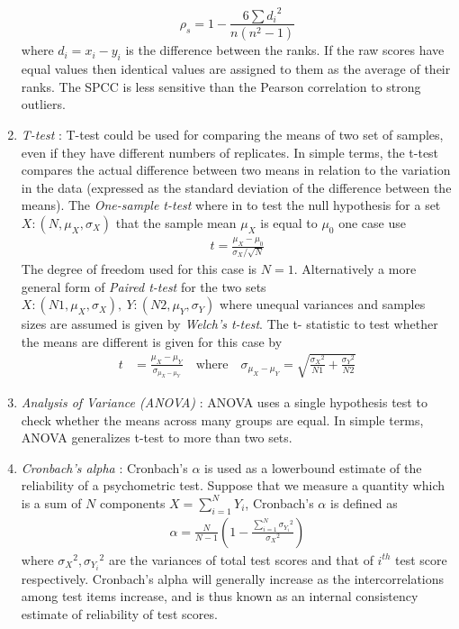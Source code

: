 \begin{enumerate}
\begin{equation}
\rho_s = 1-\frac{6\sum {d_i}^2}{n(n^2-1)} 
\end{equation}
where $d_i=x_i-y_i$ is the difference between the ranks. If the raw scores have equal values then identical values are assigned to them as the average of their ranks. The SPCC is less sensitive than the Pearson correlation to strong outliers. 
\item \emph{T-test} : T-test could be used for comparing the means of two set of samples, even if they have different numbers of replicates. In simple terms, the t-test compares the actual difference between two means in relation to the variation in the data (expressed as the standard deviation of the difference between the means). The \emph{One-sample t-test} where in to test the null hypothesis for a set $X:(N,\mu_X,\sigma_X)$ that the sample mean $\mu_X$ is equal to $\mu_0$ one case use
\begin{align*}
t = \frac{\mu_X - \mu_0}{\sigma_X/\sqrt{N}}
\end{align*}
The degree of freedom used for this case is $N=1$. Alternatively a more general form of \emph{Paired t-test} for the two sets $X:(N1,\mu_X,\sigma_X),\ Y:(N2,\mu_Y,\sigma_Y)$ where unequal variances and samples sizes are assumed is given by \emph{Welch's t-test}. The t- statistic to test whether the means are different is given for this case by
\begin{align*}
t &= \frac{\mu_X-\mu_Y}{\sigma_{\mu_X-\mu_Y}} \quad \text{where} \quad \sigma_{\mu_X-\mu_Y} = \sqrt{\frac{{\sigma_X}^2}{N1}+\frac{{\sigma_Y}^2}{N2}} 
\end{align*}
\item \emph{Analysis of Variance (ANOVA)} : ANOVA uses a single hypothesis test to check whether the means across many groups are equal. In simple terms, ANOVA generalizes t-test to more than two sets.  
\item \emph{Cronbach's alpha} : Cronbach's $\alpha$ is used as a lowerbound estimate of the reliability of a psychometric test. Suppose that we measure a quantity which is a sum of $N$ components $X = \sum_{i=1}^{N} Y_i$, Cronbach's $\alpha$ is defined as 
\begin{align*}
\alpha = \frac{N}{N-1} (1 - \frac{\sum_{i=1}^{N} {\sigma_{Y_i}}^2}{{\sigma_{X}}^2})
\end{align*}
where ${\sigma_X}^2,{\sigma_{Y_i}}^2$ are the variances of total test scores and that of $i^{th}$ test score respectively. Cronbach's alpha will generally increase as the intercorrelations among test items increase, and is thus known as an internal consistency estimate of reliability of test scores.
\end{enumerate}
